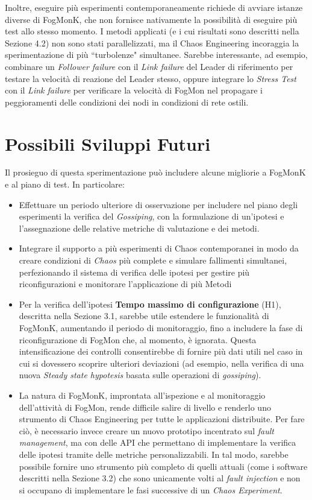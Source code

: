         Inoltre, eseguire più esperimenti contemporaneamente richiede di avviare istanze diverse di FogMonK, che non fornisce nativamente la possibilità di eseguire più test allo stesso momento. I metodi applicati (e i cui risultati sono descritti nella Sezione 4.2) non sono stati parallelizzati, ma il Chaos Engineering incoraggia la sperimentazione di più ``turbolenze" simultanee. Sarebbe interessante, ad esempio, combinare un \textit{Follower failure} con il \textit{Link failure} del Leader di riferimento per testare la velocità di reazione del Leader stesso, oppure integrare lo \textit{Stress Test} con il \textit{Link failure} per verificare la velocità di FogMon nel propagare i peggioramenti delle condizioni dei nodi in condizioni di rete ostili.

    \section{Possibili Sviluppi Futuri}
    Il prosieguo di questa sperimentazione può includere alcune migliorie a FogMonK e al piano di test. In particolare:
    \begin{itemize}
        \item Effettuare un periodo ulteriore di osservazione per includere nel piano degli esperimenti la verifica del \textit{Gossiping}, con la formulazione di un'ipotesi e l'assegnazione delle relative metriche di valutazione e dei metodi.
        \item Integrare il supporto a più esperimenti di Chaos contemporanei in modo da creare condizioni di \textit{Chaos} più complete e simulare fallimenti simultanei, perfezionando il sistema di verifica delle ipotesi per gestire più riconfigurazioni e monitorare l'applicazione di più Metodi
        \item Per la verifica dell'ipotesi \textbf{Tempo massimo di configurazione} (H1), descritta nella Sezione 3.1, sarebbe utile estendere le funzionalità di FogMonK, aumentando il periodo di monitoraggio, fino a includere la fase di riconfigurazione di FogMon che, al momento, è ignorata. Questa intensificazione dei controlli consentirebbe di fornire più dati utili nel caso in cui si dovessero scoprire ulteriori deviazioni (ad esempio, nella verifica di una nuova \textit{Steady state hypotesis} basata sulle operazioni di \textit{gossiping}).
        \item La natura di FogMonK, improntata all'ispezione e al monitoraggio dell'attività di FogMon, rende difficile salire di livello e renderlo uno strumento di Chaos Engineering per tutte le applicazioni distribuite. Per fare ciò, è necessario invece creare un nuovo prototipo incentrato sul \textit{fault management}, ma con delle API che permettano di implementare la verifica delle ipotesi tramite delle metriche personalizzabili. In tal modo, sarebbe possibile fornire uno strumento più completo di quelli attuali (come i software descritti nella Sezione 3.2) che sono unicamente volti al \textit{fault injection} e non si occupano di implementare le fasi successive di un \textit{Chaos Experiment}.
    \end{itemize}
    